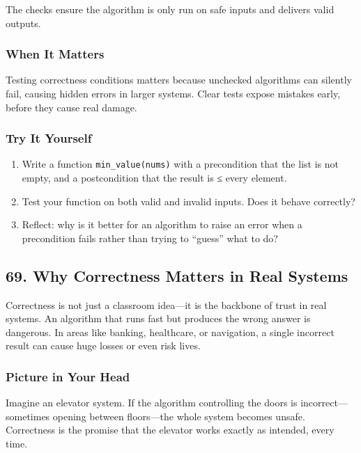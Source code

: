 \documentclass[
  letterpaper,
  DIV=11,
  numbers=noendperiod]{scrreprt}
\providecommand{\tightlist}{%
  \setlength{\itemsep}{0pt}\setlength{\parskip}{0pt}}
\begin{document}
The checks ensure the algorithm is only run on safe inputs and delivers
valid outputs.

\subsubsection{When It Matters}\label{when-it-matters-65}

Testing correctness conditions matters because unchecked algorithms can
silently fail, causing hidden errors in larger systems. Clear tests
expose mistakes early, before they cause real damage.

\subsubsection{Try It Yourself}\label{try-it-yourself-67}

\begin{enumerate}
\def\labelenumi{\arabic{enumi}.}
\tightlist
\item
  Write a function \texttt{min\_value(nums)} with a precondition that
  the list is not empty, and a postcondition that the result is ≤ every
  element.
\item
  Test your function on both valid and invalid inputs. Does it behave
  correctly?
\item
  Reflect: why is it better for an algorithm to raise an error when a
  precondition fails rather than trying to ``guess'' what to do?
\end{enumerate}

\subsection{69. Why Correctness Matters in Real
Systems}\label{why-correctness-matters-in-real-systems}

Correctness is not just a classroom idea---it is the backbone of trust
in real systems. An algorithm that runs fast but produces the wrong
answer is dangerous. In areas like banking, healthcare, or navigation, a
single incorrect result can cause huge losses or even risk lives.

\subsubsection{Picture in Your Head}\label{picture-in-your-head-68}

Imagine an elevator system. If the algorithm controlling the doors is
incorrect---sometimes opening between floors---the whole system becomes
unsafe. Correctness is the promise that the elevator works exactly as
intended, every time.
\end{document}
